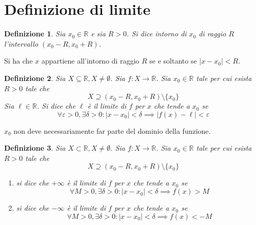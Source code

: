 \documentclass[11pt]{book}
\newtheorem{definition}{Definizione}[chapter]
\begin{document}
\section{Definizione di limite}
\begin{definition}
    Sia $x_0\in\mathbb{R}$ e sia $R>0$. Si dice intorno di $x_0$ di raggio $R$ l'intervallo $(x_0-R,x_0+R)$.
\end{definition}
Si ha che $x$ appartiene all'intorno di raggio $R$ se e soltanto se $|x-x_0|<R$.
\begin{definition}
    Sia $X\subseteq\mathbb{R},X\neq\emptyset$. Sia $f:X\rightarrow\mathbb{R}$. Sia $x_0\in\mathbb{R}$ tale per cui esista 
    $R>0$ tale che
    \begin{equation*}
        X\supseteq(x_0-R,x_0+R)\setminus\{x_0\}
    \end{equation*}
    Sia $\ell\in\mathbb{R}$. Si dice che $\ell$ è il limite di $f$ per $x$ che tende a $x_0$ se
    \begin{equation*}
        \forall\varepsilon>0,\exists\delta>0:|x-x_0|<\delta\implies|f(x)-\ell|<\varepsilon
    \end{equation*}
\end{definition}
$x_0$ non deve necessariamente far parte del dominio della funzione.
\begin{definition}
    Sia $X\subset\mathbb{R},X\neq\emptyset$. Sia $f:X\rightarrow\mathbb{R}$. Sia $x_0\in\mathbb{R}$ tale per cui esista 
    $R>0$ tale che 
    \begin{equation*}
        X\supseteq(x_0-R,x_0+R)\setminus\{x_0\}
    \end{equation*}
    \begin{enumerate}
        \item si dice che $+\infty$ è il limite di $f$ per $x$ che tende a $x_0$ se 
        \begin{equation*}
            \forall M>0,\exists\delta>0:|x-x_0|<\delta\implies f(x)>M
        \end{equation*}
        \item si dice che $-\infty$ è il limite di $f$ per $x$ che tende a $x_0$ se 
        \begin{equation*}
            \forall M>0,\exists\delta>0:|x-x_0|<\delta\implies f(x)<-M
        \end{equation*}
    \end{enumerate}
\end{definition}
\end{document}
